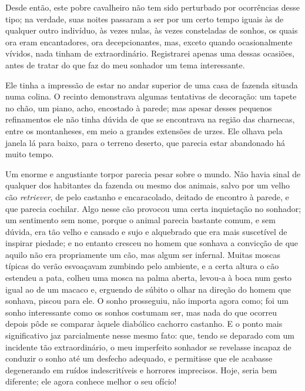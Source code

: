 Desde então, este pobre cavalheiro não tem sido perturbado por
ocorrências desse tipo; na verdade, suas noites passaram a ser por um
certo tempo iguais às de qualquer outro indivíduo, às vezes nulas, às
vezes consteladas de sonhos, os quais ora eram encantadores, ora
decepcionantes, mas, exceto quando ocasionalmente vívidos, nada tinham
de extraordinário.  Registrarei apenas uma dessas ocasiões, antes de
tratar do que faz do meu sonhador um tema interessante.

Ele tinha a impressão de estar no andar superior de uma casa de fazenda
situada numa colina.  O recinto demonstrava algumas tentativas de
decoração: um tapete no chão, um piano, acho, encostado à parede; mas
apesar desses pequenos refinamentos ele não tinha dúvida de que se
encontrava na região das charnecas, entre os montanheses, em meio a
grandes extensões de urzes.  Ele olhava pela janela lá para baixo, para
o terreno deserto, que parecia estar abandonado há muito tempo.

Um enorme e angustiante torpor parecia pesar sobre o mundo.  Não havia
sinal de qualquer dos habitantes da fazenda ou mesmo dos animais, salvo
por um velho cão \textit{retriever}, de pelo castanho e encaracolado,
deitado de encontro à parede, e que parecia cochilar.  Algo nesse cão
provocou uma certa inquietação no sonhador; um sentimento sem nome,
porque o animal parecia bastante comum, e sem dúvida, era tão velho e
cansado e sujo e alquebrado que era mais suscetível de inspirar
piedade; e no entanto cresceu no homem que sonhava a convicção de que
aquilo não era propriamente um cão, mas algum ser infernal.  Muitas
moscas típicas do verão esvoaçavam zumbindo pelo ambiente, e a certa
altura o cão estendeu a pata, colheu uma mosca na palma aberta, levou-a
à boca num gesto igual ao de um macaco e, erguendo de súbito o olhar na
direção do homem que sonhava, piscou para ele.  O sonho
prosseguiu, não importa agora como; foi um sonho interessante como os
sonhos costumam ser, mas nada do que ocorreu depois pôde se comparar
àquele diabólico cachorro castanho.  E o ponto mais significativo jaz
parcialmente nesse mesmo fato: que, tendo se deparado com um incidente
tão extraordinário, o meu imperfeito sonhador se revelasse incapaz de
conduzir o sonho até um desfecho adequado, e permitisse que ele
acabasse degenerando em ruídos indescritíveis e horrores imprecisos. 
Hoje, seria bem diferente; ele agora conhece melhor o seu ofício!

